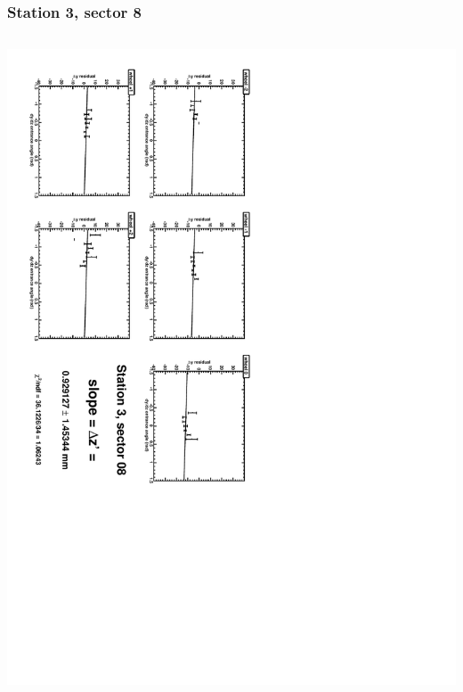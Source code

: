 \documentclass[compress]{beamer}
\begin{document}
\begin{frame}
\frametitle{Station 3, sector 8}
\begin{columns}
\includegraphics[height=\linewidth, angle=90]{zfits/zfit_3_08.pdf}


\end{columns}
\end{frame}
\end{document}
